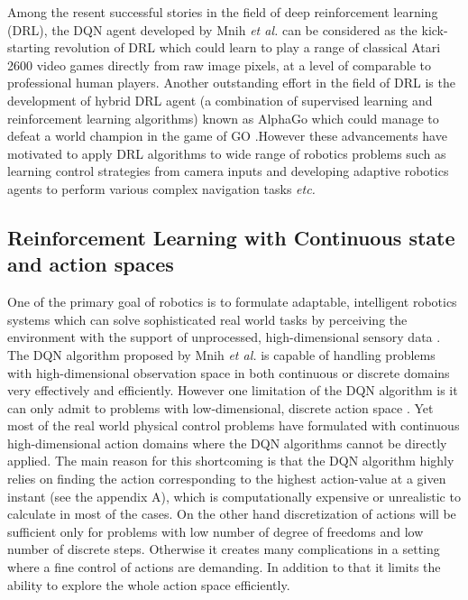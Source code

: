 \documentclass[a4paper,oneside,12pt]{report}
\begin{document}
Among the resent successful stories in the field of deep reinforcement learning (DRL), the DQN agent developed by Mnih \textit{et al.} \cite{R04} can be considered as the kick-starting revolution of DRL \cite{R50} which could learn to play a range of classical Atari 2600 video games directly from raw image pixels, at a level of comparable to professional human players. Another outstanding effort in the field of DRL is the development of hybrid DRL agent \cite{R52} (a combination of supervised learning and reinforcement learning algorithms) known as AlphaGo \cite{R51} which could manage to defeat a world champion in the game of GO \cite{R50}.However these advancements have motivated to apply DRL algorithms to wide range of robotics problems such as learning control strategies from camera inputs \cite{R53} \cite{R54} and developing adaptive robotics agents to perform various complex navigation tasks \cite{R08} \cite{R18} \cite{R23} \cite{R29} \textit{etc.}
 
\subsection{Reinforcement Learning with Continuous state and action spaces }

One of the primary goal of robotics is to formulate adaptable, intelligent robotics systems which can solve sophisticated real world tasks by perceiving the environment with the support of unprocessed, high-dimensional sensory data \cite{R06}. The DQN algorithm proposed by Mnih \textit{et al.} \cite{R04} is capable of handling problems with high-dimensional observation space in both continuous or discrete domains very effectively and efficiently. However one limitation of the DQN algorithm is it can only admit to problems with low-dimensional, discrete action space \cite{R06} \cite{R19}\cite{R50}. Yet most of the real world physical control problems have formulated with continuous high-dimensional action domains where the DQN algorithms cannot be directly applied. The main reason for this shortcoming is that the DQN algorithm highly relies on finding the action corresponding to the highest action-value at a given instant (see the appendix A), which is computationally expensive or unrealistic to calculate in most of the cases. On the other hand discretization of actions will be sufficient only for problems with low number of degree of freedoms and low number of discrete steps. Otherwise it creates many complications in a setting where a fine control of actions are demanding. In addition to that it limits the ability to explore the whole action space efficiently.
\end{document}
